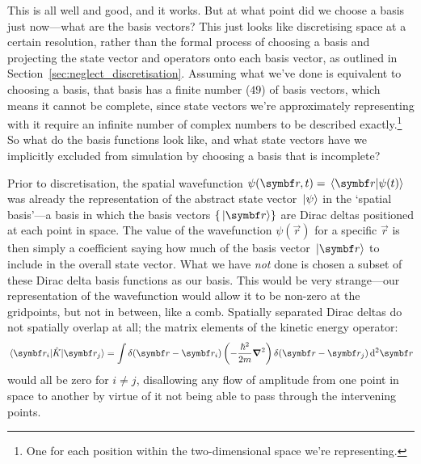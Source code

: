 This is all well and good, and it works. But at what point did we choose a basis just now---what are the basis vectors? This just looks like discretising space at a certain resolution, rather than the formal process of choosing a basis and projecting the state vector and operators onto each basis vector, as outlined in Section~\ref{sec:neglect_discretisation}. Assuming what we've done is equivalent to choosing a basis, that basis has a finite number ($49$) of basis vectors, which means it cannot be complete, since state vectors we're approximately representing with it require an infinite number of complex numbers to be described exactly.\footnote{One for each position within the two-dimensional space we're representing.} So what do the basis functions look like, and what state vectors have we implicitly excluded from simulation by choosing a basis that is incomplete?

Prior to discretisation, the spatial wavefunction $\psi(\vec r, t) = \braket{\vec r}{\psi(t)}$ was already the representation of the abstract state vector $\ket{\psi}$ in the `spatial basis'---a basis in which the basis vectors $\{\ket{\vec r}\}$ are Dirac deltas positioned at each point in space. The value of the wavefunction $\psi(\vec r)$ for a specific $\vec r$ is then simply a coefficient saying how much of the basis vector $\ket{\vec r}$ to include in the overall state vector. What we have \emph{not} done is chosen a subset of these Dirac delta basis functions as our basis. This would be very strange---our representation of the wavefunction would allow it to be non-zero at the gridpoints, but not in between, like a comb. Spatially separated Dirac deltas do not spatially overlap at all; the matrix elements of the kinetic energy operator:
\begin{align}
\matrixel{\vec r_i}{\hat K}{\vec r_j} = \int \delta(\vec r - \vec r_i)\left(-\frac{\hbar^2}{2m}\grad^2\right)\delta(\vec r - \vec r_j)\,\dd^2 \vec r
\end{align}
would all be zero for $i\neq j$, disallowing any flow of amplitude from one point in space to another by virtue of it not being able to pass through the intervening points.

